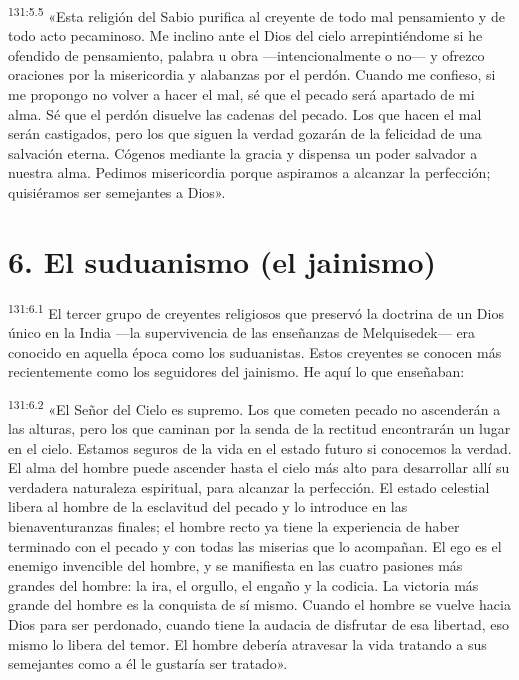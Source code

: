 \par 
\textsuperscript{131:5.5} «Esta religión del Sabio purifica al creyente de todo mal pensamiento y de todo acto pecaminoso. Me inclino ante el Dios del cielo arrepintiéndome si he ofendido de pensamiento, palabra u obra ---intencionalmente o no--- y ofrezco oraciones por la misericordia y alabanzas por el perdón. Cuando me confieso, si me propongo no volver a hacer el mal, sé que el pecado será apartado de mi alma. Sé que el perdón disuelve las cadenas del pecado. Los que hacen el mal serán castigados, pero los que siguen la verdad gozarán de la felicidad de una salvación eterna. Cógenos mediante la gracia y dispensa un poder salvador a nuestra alma. Pedimos misericordia porque aspiramos a alcanzar la perfección; quisiéramos ser semejantes a Dios».

\section*{6. El suduanismo (el jainismo)}
\par 
\textsuperscript{131:6.1} El tercer grupo de creyentes religiosos que preservó la doctrina de un Dios único en la India ---la supervivencia de las enseñanzas de Melquisedek--- era conocido en aquella época como los suduanistas. Estos creyentes se conocen más recientemente como los seguidores del jainismo. He aquí lo que enseñaban:

\par 
\textsuperscript{131:6.2} «El Señor del Cielo es supremo. Los que cometen pecado no ascenderán a las alturas, pero los que caminan por la senda de la rectitud encontrarán un lugar en el cielo. Estamos seguros de la vida en el estado futuro si conocemos la verdad. El alma del hombre puede ascender hasta el cielo más alto para desarrollar allí su verdadera naturaleza espiritual, para alcanzar la perfección. El estado celestial libera al hombre de la esclavitud del pecado y lo introduce en las bienaventuranzas finales; el hombre recto ya tiene la experiencia de haber terminado con el pecado y con todas las miserias que lo acompañan. El ego es el enemigo invencible del hombre, y se manifiesta en las cuatro pasiones más grandes del hombre: la ira, el orgullo, el engaño y la codicia. La victoria más grande del hombre es la conquista de sí mismo. Cuando el hombre se vuelve hacia Dios para ser perdonado, cuando tiene la audacia de disfrutar de esa libertad, eso mismo lo libera del temor. El hombre debería atravesar la vida tratando a sus semejantes como a él le gustaría ser tratado».

